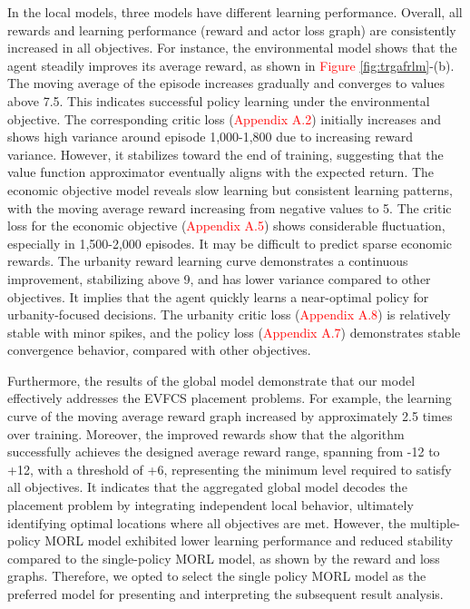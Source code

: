 \documentclass[preprint,12pt]{elsarticle}
\begin{document}
In the local models, three models have different learning performance. Overall, all rewards and learning performance (reward and actor loss graph) are consistently increased in all objectives. For instance, the environmental model shows that the agent steadily improves its average reward, as shown in \textcolor{red}{Figure \ref{fig:trgafrlm}}-(b). The moving average of the episode increases gradually and converges to values above 7.5. This indicates successful policy learning under the environmental objective. The corresponding critic loss (\textcolor{red}{Appendix A.2}) initially increases and shows high variance around episode 1,000-1,800 due to increasing reward variance. However, it stabilizes toward the end of training, suggesting that the value function approximator eventually aligns with the expected return. The economic objective model reveals slow learning but consistent learning patterns, with the moving average reward increasing from negative values to 5. The critic loss for the economic objective (\textcolor{red}{Appendix A.5}) shows considerable fluctuation, especially in 1,500-2,000 episodes. It may be difficult to predict sparse economic rewards. The urbanity reward learning curve demonstrates a continuous improvement, stabilizing above 9, and has lower variance compared to other objectives. It implies that the agent quickly learns a near-optimal policy for urbanity-focused decisions. The urbanity critic loss (\textcolor{red}{Appendix A.8}) is relatively stable with minor spikes, and the policy loss (\textcolor{red}{Appendix A.7}) demonstrates stable convergence behavior, compared with other objectives. 

Furthermore, the results of the global model demonstrate that our model effectively addresses the EVFCS placement problems. For example, the learning curve of the moving average reward graph increased by approximately 2.5 times over training. Moreover, the improved rewards show that the algorithm successfully achieves the designed average reward range, spanning from -12 to +12, with a threshold of +6, representing the minimum level required to satisfy all objectives. It indicates that the aggregated global model decodes the placement problem by integrating independent local behavior, ultimately identifying optimal locations where all objectives are met. However, the multiple-policy MORL model exhibited lower learning performance and reduced stability compared to the single-policy MORL model, as shown by the reward and loss graphs. Therefore, we opted to select the single policy MORL model as the preferred model for presenting and interpreting the subsequent result analysis.
\end{document}
